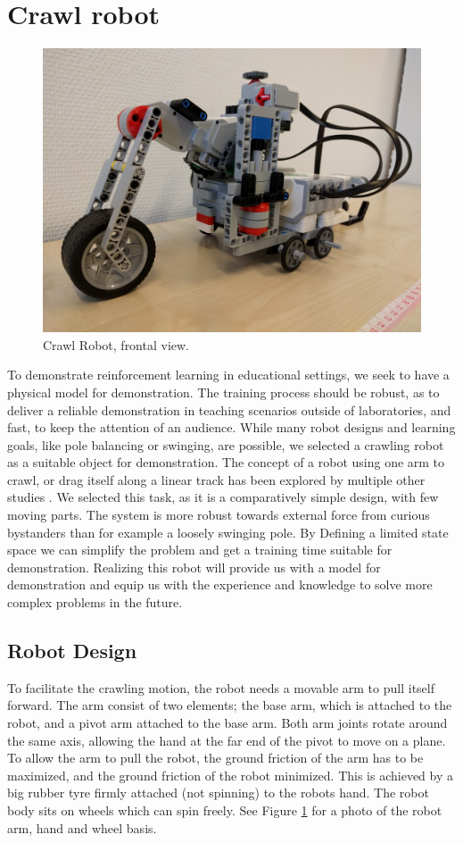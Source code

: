 \documentclass[11pt, a4paper]{article}
\begin{document}
	\section{Crawl robot}
	\begin{figure}[H]
		\centering
		\includegraphics[width=0.6\linewidth]{images/crawl_robot}
		\caption{Crawl Robot, frontal view.}
		\label{fig:crawl_robot}
	\end{figure}
	To demonstrate reinforcement learning in educational settings, we seek to have a physical model for demonstration. The training process should be robust, as to deliver a reliable demonstration in teaching scenarios outside of laboratories, and fast, to keep the attention of an audience. While many robot designs and learning goals, like pole balancing or swinging, are possible, we selected a crawling robot as a suitable object for demonstration. The concept of a robot using one arm to crawl, or drag itself along a linear track has been explored by multiple other studies \cite{youtube_crawl2} \cite{youtube_crawl}. We selected this task, as it is a comparatively simple design, with few moving parts. The system is more robust towards external force from curious bystanders than for example a loosely swinging pole. By Defining a limited state space we can simplify the problem and get a training time suitable for demonstration. Realizing this robot will provide us with a model for demonstration  and equip us with the experience and knowledge to solve more complex problems in the future.
	
	
	\subsection{Robot Design}
	To facilitate the crawling motion, the robot needs a movable arm to pull itself forward. The arm consist of two elements; the base arm, which is attached to the robot, and a pivot arm attached to the base arm. Both arm joints rotate around the same axis, allowing the hand at the far end of the pivot to move on a plane. To allow the arm to pull the robot, the ground friction of the arm has to be maximized, and the ground friction of the robot minimized. This is achieved by a big rubber tyre firmly attached (not spinning) to the robots hand. The robot body sits on wheels which can spin freely. See Figure \ref{fig:crawl_robot} for a photo of the robot arm, hand and wheel basis.
	
\end{document}
